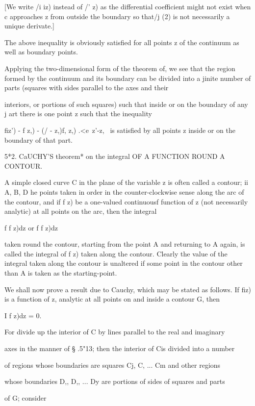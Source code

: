 [We write /i iz) instead of /' z) as the differential coefficient
might not exist when c approaches z from outside the boundary so
that/j (2) is not necessarily a unique derivate.]

The above inequality is obviously satisfied for all points z of the
continuum as well as boundary points.

Applying the two-dimensional form of the theorem of, we see that
the region formed by the continuum and its boundary can be divided
into a jinite number of parts (squares with sides parallel to the axes
and their

%
%

interiors, or portions of such squares) such that inside or on the
boundary of any j art there is one point z such that the inequality

fiz') - f z,) - (/ - z,)f, z,) .<e\ z'-z, \ is satisfied by all points
z inside or on the boundary of that part.

5*2. CaUCHY'S theorem* on the integral OF A FUNCTION ROUND A CONTOUR.

A simple closed curve C in the plane of the variable z is often called
a contour; ii A, B, D he points taken in order in the
counter-clockwise sense along the arc of the contour, and if f z) be a
one-valued continuousf function of z (not necessarily analytic) at all
points on the arc, then the integral

f f z)dz or f f z)dz

taken round the contour, starting from the point A and returning to A
again, is called the integral of f z) taken along the contour. Clearly
the value of the integral taken along the contour is unaltered if some
point in the contour other than A is taken as the starting-point.

We shall now prove a result due to Cauchy, which may be stated as
follows. If fiz) is a function of z, analytic at all points on and
inside a contour G, then

I f z)dz = 0.

For divide up the interior of C by lines parallel to the real and
imaginary

axes in the manner of § .5"13; then the interior of Cis divided into
a number

of regions whose boundaries are squares Cj, C, ... Cm and other
regions

whose boundaries D,, D,, ... Dy are portions of sides of squares and
parts

of G; consider

